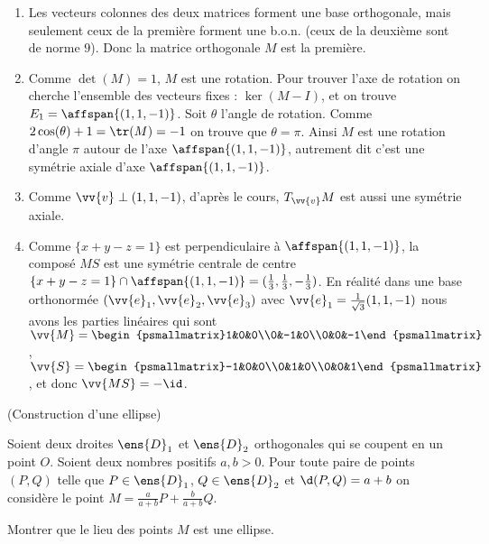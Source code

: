 \documentclass[a4paper,12pt,reqno]{amsart}
\begin{document}
\begin{solution}


  \begin{enumerate}
    \item Les vecteurs colonnes des deux matrices forment une base orthogonale, mais seulement ceux de la première forment une b.o.n. (ceux de la deuxième sont de norme $9$). Donc la matrice orthogonale $M$ est la première.
    \item Comme $\det(M)=1$, $M$ est une rotation. Pour trouver l'axe de rotation on cherche l'ensemble des vecteurs fixes : $\ker(M-I)$, et on trouve $E_{1}=\affspan{(1,1,-1)}$. Soit $\theta$ l'angle de rotation. Comme $2\cos(\theta)+1=\tr(M)=-1$ on trouve que $\theta=\pi$. Ainsi $M$ est une rotation d'angle $\pi$ autour de l'axe $\affspan{(1,1,-1)}$, autrement dit c'est une symétrie axiale d'axe $\affspan{(1,1,-1)}$.
    \item Comme $\vv{v} \perp (1,1,-1)$, d'après le cours, $T_{\vv{v}}M$ est aussi une symétrie axiale.
    \item Comme $\{x+y-z=1\}$ est perpendiculaire à $\affspan{(1,1,-1)}$, la composé $MS$ est une symétrie centrale de centre $\{x+y-z=1\} \cap \affspan{(1,1,-1)} = {(\frac13,\frac13,-\frac13)}$. En réalité dans une base orthonormée $(\vv{e}_{1}, \vv{e}_{2}, \vv{e}_{3})$ avec $\vv{e}_{1}=\frac{1}{\sqrt{3}}(1,1,-1)$ nous avons les parties linéaires qui sont $\vv{M}=\begin{psmallmatrix}1&0&0\\0&-1&0\\0&0&-1\end{psmallmatrix}$, $\vv{S}=\begin{psmallmatrix}-1&0&0\\0&1&0\\0&0&1\end{psmallmatrix}$, et donc $\vv{MS}=-\id$.
  \end{enumerate}
\end{solution}


\begin{exo} (Construction d'une ellipse)

  \begin{wrapfigure}{r}{57mm}
    \centering\vspace{-7mm}
  \end{wrapfigure}
  Soient deux droites $\ens{D}_{1}$ et $\ens{D}_{2}$ orthogonales qui se coupent en un point $O$. Soient deux nombres positifs $a,b>0$. Pour toute paire de points $(P,Q)$ telle que $P \in \ens{D}_{1}$, $Q \in \ens{D}_{2}$ et $\d(P,Q)=a+b$ on considère le point $M=\frac{a}{a+b}P+\frac{b}{a+b}Q$.

  Montrer que le lieu des points $M$ est une ellipse.

\end{exo}
\end{document}
